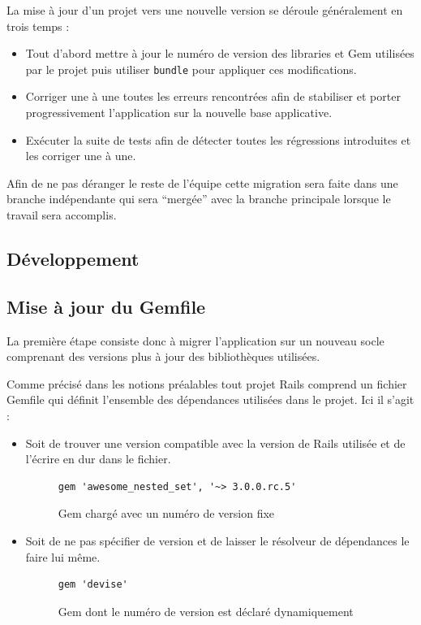\documentclass[12pt,a4paper]{book}
\begin{document}
La mise à jour d'un projet vers une nouvelle version se déroule généralement en trois temps :
\begin{itemize}
  \item Tout d'abord mettre à jour le numéro de version des libraries et Gem utilisées par le projet puis utiliser \texttt{bundle} pour appliquer ces modifications.
  \item Corriger une à une toutes les erreurs rencontrées afin de stabiliser et porter progressivement l'application sur la nouvelle base applicative.
  \item Exécuter la suite de tests afin de détecter toutes les régressions introduites et les corriger une à une.
\end{itemize}

Afin de ne pas déranger le reste de l'équipe cette migration sera faite dans une branche indépendante qui sera ``mergée'' avec la branche principale lorsque le travail sera accomplis.

\subsection{Développement}

\subsection{Mise à jour du Gemfile}

La première étape consiste donc à migrer l'application sur un nouveau socle comprenant des versions plus à jour des bibliothèques utilisées.

Comme précisé dans les notions préalables tout projet Rails comprend un fichier Gemfile qui définit l'ensemble des dépendances utilisées dans le projet. Ici il s'agit :
\begin{itemize}
  \item Soit de trouver une version compatible avec la version de Rails utilisée et de l'écrire en dur dans le fichier.
  
    \begin{figure}[h]
    \lstset{language=ruby}
    \begin{lstlisting}
gem 'awesome_nested_set', '~> 3.0.0.rc.5'
    \end{lstlisting}
     \caption{Gem chargé avec un numéro de version fixe}
    \end{figure}
    
  \item Soit de ne pas spécifier de version et de laisser le résolveur de dépendances le faire lui même.
  
    \begin{figure}[h]
    \lstset{language=ruby}
    \begin{lstlisting}
gem 'devise'
    \end{lstlisting}
     \caption{Gem dont le numéro de version est déclaré dynamiquement}
    \end{figure}
\end{itemize}
\end{document}
